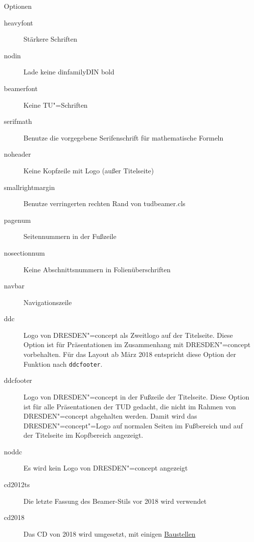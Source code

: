 \begin{frame}[allowframebreaks]{Optionen}
  \begin{description}
    \item[heavyfont] Stärkere Schriften
    \item[nodin] Lade keine {\csname dinfamily\endcsname DIN bold}%
    \item[beamerfont] Keine TU"=Schriften
    \item[serifmath] Benutze die vorgegebene Serifenschrift für mathematische Formeln
    \item[noheader] Keine Kopfzeile mit Logo (außer Titelseite)
    \item[smallrightmargin] Benutze verringerten rechten Rand von tudbeamer.cls
    \item[pagenum] Seitennummern in der Fußzeile
    \item[nosectionnum] Keine Abschnittsnummern in Folienüberschriften
    \item[navbar] Navigationszeile
    \item[ddc] Logo von DRESDEN"=concept als Zweitlogo auf der
      Titelseite. Diese
      Option ist für Präsentationen im Zusammenhang mit
      DRESDEN"=concept vorbehalten. Für das Layout ab März 2018
      entspricht diese Option der Funktion nach \texttt{ddcfooter}.
    \item[ddcfooter] Logo von DRESDEN"=concept in der Fußzeile der
      Titelseite. Diese Option ist für alle Präsentationen der TUD
      gedacht, die nicht im Rahmen von DRESDEN"=concept abgehalten
      werden. Damit wird das DRESDEN"=concept"=Logo auf normalen
      Seiten im Fußbereich und auf der Titelseite im Kopfbereich
      angezeigt.
    \item[noddc] Es wird kein Logo von DRESDEN"=concept angezeigt
    \item[cd2012ts] Die letzte Fassung des Beamer-Stils vor 2018 wird verwendet
    \item[cd2018] Das CD von 2018 wird umgesetzt, mit einigen \hyperref[baustellen]{Baustellen}
  \end{description}
\end{frame}

